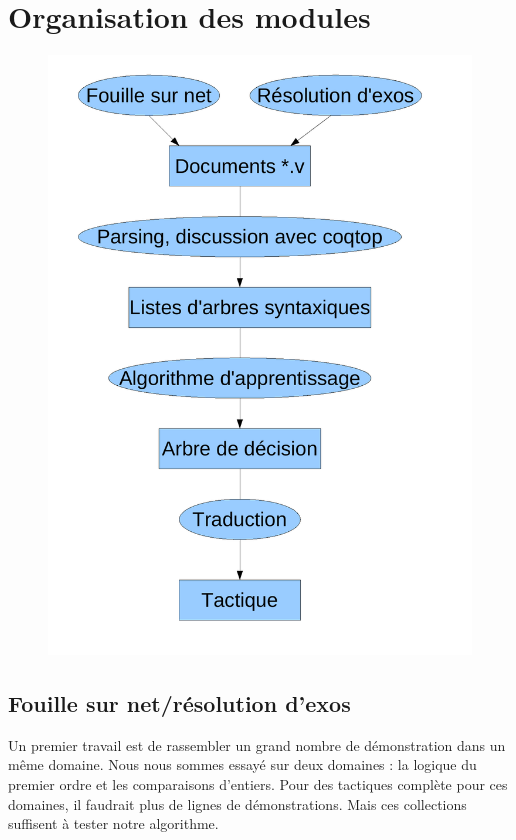 \section{Organisation des modules}
  \begin{figure}[h]
    \includegraphics[scale=0.35]{../images/apprentissage/organisation_apprentissage.pdf}
  \end{figure}
  \subsection{Fouille sur net/résolution d'exos}
  Un premier travail est de rassembler un grand nombre de démonstration dans un même domaine. Nous nous sommes essayé sur deux domaines : la logique du premier ordre et les comparaisons d'entiers. Pour des tactiques complète pour ces domaines, il faudrait plus de lignes de démonstrations. Mais ces collections suffisent à tester notre algorithme.
